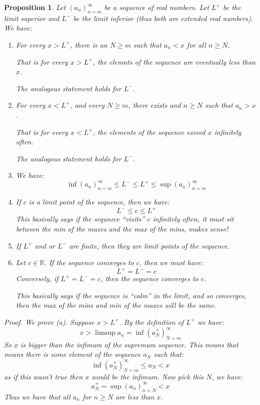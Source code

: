 \documentclass{article}
\newtheorem{proposition}{Proposition}[subsection]
\newcommand{\R}{\mathbb{R}}
\let\it\textit
\begin{document}
\begin{proposition}
	Let $(a_n)_{n=m}^\infty$ be a sequence of real numbers. 
	Let $L^+$ be the limit superior and $L^-$ be the 
	limit inferior (thus both are extended real 
	numbers). We have:
	\begin{enumerate}[label=(\alph*)]
		\item For every $x > L^+$, there is 
			an $N \geq m$ such that $a_n < x$ 
			for all $n \geq N$.

			That is for every $x > L^+$, the elemnts 
			of the sequence are eventually less than $x$.

			The analogous statement holds for $L^-$.
		\item For every $x < L^+$, and 
			every $N \geq m$, there exists 
			and $n \geq N$ such that $a_n > x$.

			That is for every $x < L^+$, the
			elements of the sequence 
			exceed $x$ infinitely often.

			The analogous statement holds for $L^-$.
		\item We have:
			$$
			\inf (a_n)_{n=m}^\infty  \leq L^- \leq L^+
			\leq \sup (a_n)_{n=m}^\infty 
			$$
		\item If $c$ is a limit point of the sequence, 
			then we have:
			$$
			L^- \leq c \leq L^+
			$$
			This basically says if the sequnece ``visits''
			$c$ infinitely often, it must sit between 
			the min of the maxes and the max of the mins,
			makes sense!
		\item If $L^+$ and or $L^-$ are finite, then they 
			are limit points of the sequence.
		\item Let $c \in \R$. If the sequence converges
			to $c$, then we must have:
			$$
			L^+ = L^- = c
			$$
			Conversely, if $L^+ = L^- = c$, then the
			sequence converges to $c$.

			This basically says if the sequence is 
			``calm'' in the limit, and so converges, 
			then the max of the mins and min of the maxes
			will be the same. 
	\end{enumerate}

	\it{Proof}. We prove (a). Suppose $x > L^+$. By the definition 
	of $L^+$ we have:
	$$
	x > \limsup a_n = \inf (a_N^+)_{N=m}^\infty
	$$
	So $x$ is bigger than the infimum of the supremum sequence. 
	This means that means there is some element of the sequence
	$a_N$ such that:
	$$
	\inf (a_N^+)_{N=m}^\infty \leq a_N < x
	$$
	as if this wasn't true then $x$ would be the infimum.
	Now pick this $N$, we have:
	$$
	a_N^+ = \sup (a_n)_{n=N}^\infty < x
	$$
	Thus we have that all $a_n$ for $n \geq N$ are less than $x$.

\end{proposition}
\end{document}

